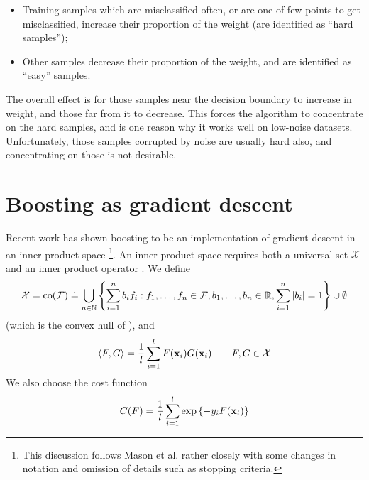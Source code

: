 \begin{itemize}

\item	Training samples which are misclassified often, or are one of 
	few points to get misclassified, increase their proportion of
	the weight (are identified as ``hard samples'');

\item	Other samples decrease their proportion of the weight, and are
	identified as ``easy'' samples.

\end{itemize}

The overall effect is for those samples near the decision boundary to
increase in weight, and those far from it to decrease.  This forces
the algorithm to concentrate on the hard samples, and is one reason
why it works well on low-noise datasets.  Unfortunately, those samples
corrupted by noise are usually hard also, and concentrating on those
is not desirable.


\section{Boosting as gradient descent}
\label{sec:theory:gradient descent}

Recent work has shown boosting to be an implementation of gradient
descent in an inner product space \cite{Mason99}\footnote{This
discussion follows Mason et al. \cite{Mason99} rather closely with
some changes in notation and omission of details such as stopping
criteria.}.
An inner product space requires both a universal set
$\mathcal{X}$ and an inner product operator \ip{\cdot}{\cdot}.  We
define
%
\begin{equation}
\mathcal{X} = 
\mathrm{co} (\mathcal{F}) \doteq
 \bigcup _{n \in \mathbb{N}}
\left\{
 \sum_{i=1}^{n}
  b_i
f_i : f_1, \ldots, f_n \in \mathcal{F},
 b_1, \ldots, b_n \in \mathbb{R},
 \sum_{i=1}^{n} | b_i | = 1
\right\} \cup \emptyset
\end{equation}
%
(which is the convex hull of \calF), and
%
\begin{equation}
\langle {F} , {G} \rangle = \frac{1}{l} \sum_{i=1}^{l} F(\mathbf{x}_i)G(\mathbf{x}_i) \qquad
F, G \in \mathcal{X}
\end{equation}
%
We also choose the cost function
%
\begin{equation}
C(F) = \frac{1}{l} \sum_{i=1}^{l} \exp
\left\{ -y_i F(\mathbf{x}_i) \right\}
\label{eqn:theory:cost function}
\end{equation}

